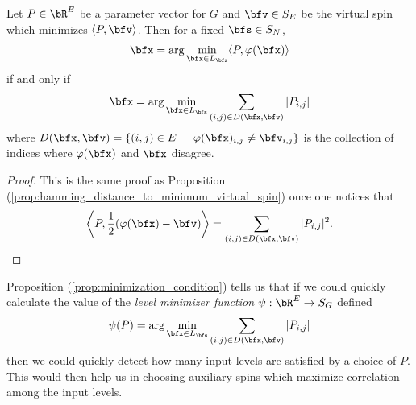 \documentclass[raggedright, nofonts, notitlepage, openany, debug]{tufte-book}
\begin{document}
\begin{prop}\label{prop:minimization_condition}
  Let $P \in \bR^E$ be a parameter vector for $G$ and $\bfv\in S_E$ be the virtual spin which minimizes $\langle P, \bfv \rangle$. Then for a fixed $\bfs \in S_N$,
  \begin{align*} 
    \bfx = \arg\min_{\bfx \in L_\bfs} \langle P, \varphi(\bfx) \rangle
  \end{align*}
  if and only if
  \begin{align*}
    \bfx = \arg\min_{\bfx \in L_{\bfs}} \sum_{(i,j) \in D(\bfx,\bfv)} |P_{i,j}|
  \end{align*}
  where $D(\bfx,\bfv) = \{(i,j) \in E ~\mid~ \varphi(\bfx)_{i,j} \neq \bfv_{i,j}\}$ is the collection of indices where $\varphi(\bfx)$ and $\bfx$ disagree.
\end{prop}
\begin{proof}
  This is the same proof as Proposition (\ref{prop:hamming_distance_to_minimum_virtual_spin}) once one notices that
  \begin{align*}
    \left\langle P, \frac{1}{2}(\varphi(\bfx) - \bfv)\right\rangle = \sum_{(i,j) \in D(\bfx,\bfv)} |P_{i,j}|^2.
  \end{align*}
\end{proof}

Proposition (\ref{prop:minimization_condition}) tells us that if we could quickly calculate the value of the \emph{level minimizer function} $\psi:\bR^E\to S_G$ defined
\begin{equation}\label{eqn:level_minimizer_function}
  \psi(P) = \arg\min_{\bfx \in L_\bfs} \sum_{(i,j) \in D(\bfx,\bfv)} |P_{i,j}|
\end{equation}
then we could quickly detect how many input levels are satisfied by a choice of $P$. This would then help us in choosing auxiliary spins which maximize correlation among the input levels.

\newpage


\end{document}
